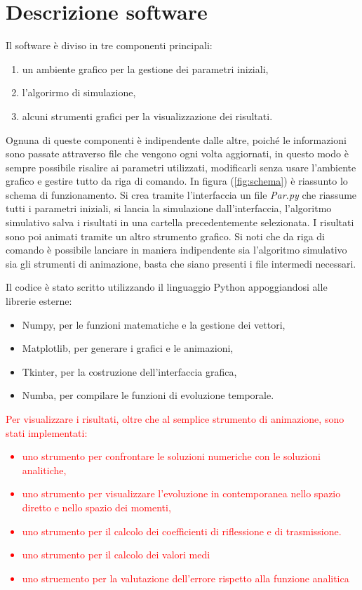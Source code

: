 \chapter{Descrizione software}
\label{ch:interface}


Il software è diviso in tre componenti principali:
\begin{enumerate} [nolistsep]
    \item un ambiente grafico per la gestione dei parametri iniziali,
    \item l'algorirmo di simulazione,
    \item alcuni strumenti grafici per la visualizzazione dei risultati.
\end{enumerate}
Ognuna di queste componenti è indipendente dalle altre, poiché le informazioni sono passate attraverso file che vengono ogni volta aggiornati, in questo modo è sempre possibile risalire ai parametri utilizzati, modificarli senza usare l'ambiente grafico e gestire tutto da riga di comando.
In figura (\ref{fig:schema}) è riassunto lo schema di funzionamento. Si crea tramite l'interfaccia un file \textsl{Par.py} che riassume tutti i parametri iniziali, si lancia la simulazione dall'interfaccia, l'algoritmo simulativo salva i risultati in una cartella precedentemente selezionata. I risultati sono poi animati tramite un altro strumento grafico. Si noti che da riga di comando è possibile lanciare in maniera indipendente sia l'algoritmo simulativo sia gli strumenti di animazione, basta che siano presenti i file intermedi necessari.

Il codice è stato scritto utilizzando il linguaggio Python appoggiandosi alle librerie esterne:
\begin{itemize}[nolistsep]
    \item Numpy, per le funzioni matematiche e la gestione dei vettori,
    \item Matplotlib, per generare i grafici e le animazioni,
    \item Tkinter, per la costruzione dell'interfaccia grafica,
    \item Numba, per compilare le funzioni di evoluzione temporale.
\end{itemize}

\textcolor{red}{
Per visualizzare i risultati, oltre che al semplice strumento di animazione, sono stati implementati:
\begin{itemize}[nolistsep]
	\item uno strumento per confrontare le soluzioni numeriche con le soluzioni analitiche, 
	\item uno strumento per visualizzare l'evoluzione in contemporanea nello spazio diretto e nello spazio dei momenti,
	\item uno strumento per il calcolo dei coefficienti di riflessione e di trasmissione.
	\item uno strumento per il calcolo dei valori medi
	\item uno struemento per la valutazione dell'errore rispetto alla funzione analitica 
\end{itemize}
}

